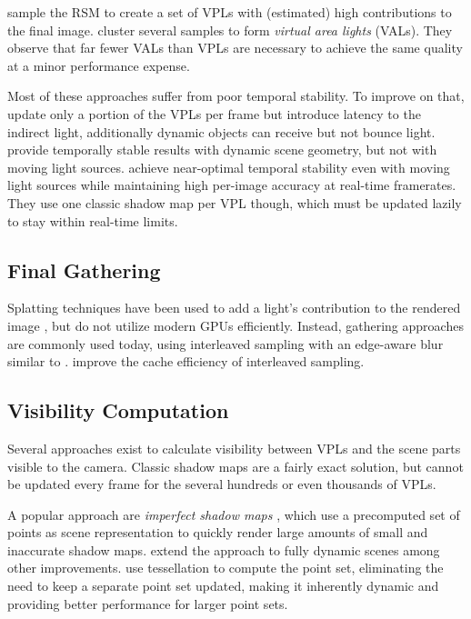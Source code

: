 \citet{georgiev2010simple, ritschel2011ismsViewAdaptive} sample the RSM to create a set of VPLs with (estimated) high contributions to the final image. \citet{dong2009real, prutkin2012reflective} cluster several samples to form \emph{virtual area lights} (VALs). They observe that far fewer VALs than VPLs are necessary to achieve the same quality at a minor performance expense.

Most of these approaches suffer from poor temporal stability. To improve on that, \citet{laine2007incremental} update only a portion of the VPLs per frame but introduce latency to the indirect light, additionally dynamic objects can receive but not bounce light. \citet{barak2013temporally} provide temporally stable results with dynamic scene geometry, but not with moving light sources. \citet{hedman2016sequential} achieve near-optimal temporal stability even with moving light sources while maintaining high per-image accuracy at real-time framerates. They use one classic shadow map per VPL though, which must be updated lazily to stay within real-time limits.


\subsection{Final Gathering}
\label{sec:manyLightsFinalGathering}

Splatting techniques have been used to add a light's contribution to the rendered image \citep{dachsbacher2006splatting, Nichols:2009:splatting}, but do not utilize modern GPUs efficiently. Instead, gathering approaches are commonly used today, using interleaved sampling \citep{Keller:2001:InterleavedSampling} with an edge-aware blur similar to \citet{laine2007incremental}. \citet{segovia2006non} improve the cache efficiency of interleaved sampling.


\subsection{Visibility Computation}

Several approaches exist to calculate visibility between VPLs and the scene parts visible to the camera. Classic shadow maps are a fairly exact solution, but cannot be updated every frame for the several hundreds or even thousands of VPLs.

A popular approach are \emph{imperfect shadow maps} \citep[ISMs,][]{ritschel2008ism}, which use a precomputed set of points as scene representation to quickly render large amounts of small and inaccurate shadow maps. \citet{ritschel2011ismsViewAdaptive} extend the approach to fully dynamic scenes among other improvements. \citet{barak2013temporally} use tessellation to compute the point set, eliminating the need to keep a separate point set updated, making it inherently dynamic and providing better performance for larger point sets.

